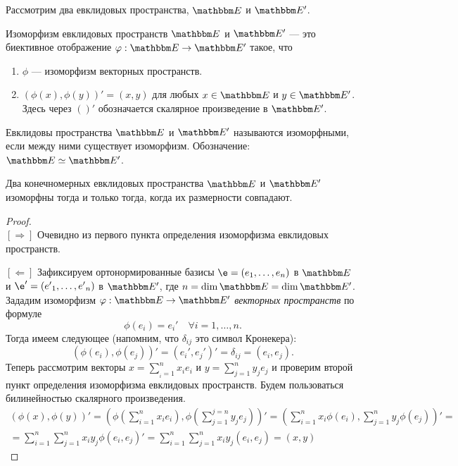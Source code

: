 Рассмотрим два евклидовых пространства, $\E$ и $\E'$.
\begin{Def}
Изоморфизм евклидовых пространств $\E$ и $\E'$  --- это биективное отображение $\phi: \E \rightarrow \E'$ такое, что
\begin{enumerate}
\item $\phi$ --- изоморфизм векторных пространств.
\item $(\phi(x), \phi(y))' = (x, y)$ для любых $x \in \E$ и $y \in \E'$. Здесь через $()'$ обозначается скалярное произведение в $\E'$.
\end{enumerate}
\end{Def}

\begin{Def}
Евклидовы пространства $\E$ и $\E'$ называются изоморфными, если между ними существует изоморфизм. Обозначение: $\E \simeq \E'$.
\end{Def}

\begin{Theorem}
Два конечномерных евклидовых пространства $\E$ и $\E'$ изоморфны тогда и только тогда, когда их размерности совпадают.
\end{Theorem}

\begin{proof}\ \\
$[\Rightarrow]$ Очевидно из первого пункта определения изоморфизма евклидовых пространств.

$[\Leftarrow]$ Зафиксируем ортонормированные базисы $\e = \vector{e}$ в $\E$ и $\e' = \vector{e'}$ в $\E'$, где $n = \dim \E = \dim \E'$. Зададим изоморфизм $\phi: \E \rightarrow \E'$ \textit{векторных пространств} по формуле
$$
\phi(e_i) = e_i'\quad \forall i = 1,\ldots, n.
$$
Тогда имеем следующее (напомним, что $\delta_{ij}$ это символ Кронекера):
$$
(\phi(e_i), \phi(e_j))' = (e_i', e_j')' = \delta_{ij} = (e_i, e_j).
$$
Теперь рассмотрим векторы $x = \sum_{_i = 1}^{n}x_ie_i$ и $y = \sum_{j = 1}^{n}y_je_j$ и проверим второй пункт определения изоморфизма евклидовых пространств. Будем пользоваться билинейностью скалярного произведения.
\begin{gather*}
(\phi(x), \phi(y))' = \left(\phi\left(\sum_{i = 1}^{n}x_ie_i\right), \phi\left(\sum_{j = 1}^{j = n}y_je_j\right)\right)' = \left(\sum_{i = 1}^{n}x_i\phi(e_i), \sum_{j = 1}^{n}y_j\phi(e_j)\right)' = \\
= \sum_{i = 1}^{n}\sum_{j = 1}^{n}x_iy_j\phi(e_i, e_j)' = \sum_{i = 1}^{n}\sum_{j = 1}^{n}x_iy_j(e_i, e_j) = (x, y)
\end{gather*}
\end{proof}

